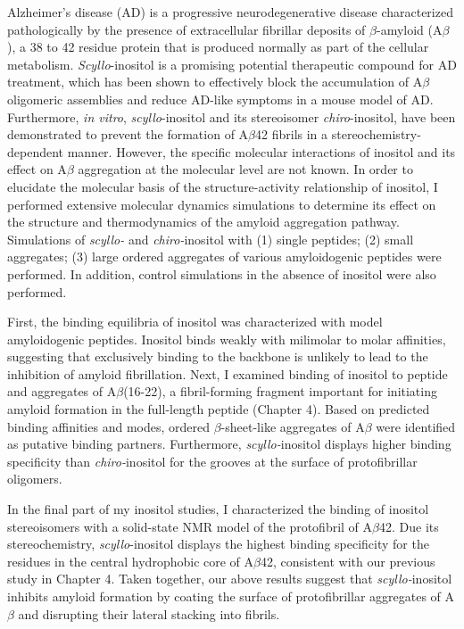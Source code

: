 Alzheimer's disease (AD) is a progressive neurodegenerative disease characterized pathologically by the presence of extracellular fibrillar deposits of $\beta$-amyloid (A$\beta$), a 38 to 42 residue protein that is produced normally as part of the cellular metabolism. \emph{Scyllo}-inositol is a promising potential therapeutic compound for AD treatment, which has been shown to effectively block the accumulation of A$\beta$ oligomeric assemblies and reduce AD-like symptoms in a mouse model of AD. Furthermore, \emph{in vitro}, \emph{scyllo}-inositol and its stereoisomer \emph{chiro}-inositol, have been demonstrated to prevent the formation of A$\beta$42 fibrils in a stereochemistry-dependent manner. However, the specific molecular interactions of inositol and its effect on A$\beta$ aggregation at the molecular level are not known. In order to elucidate the molecular basis of the structure-activity relationship of inositol, I performed extensive molecular dynamics simulations to determine its effect on the structure and thermodynamics of the amyloid aggregation pathway.  Simulations of \textit{scyllo-} and \textit{chiro-}inositol with (1) single peptides; (2) small aggregates; (3) large ordered aggregates of various amyloidogenic peptides were performed. In addition, control simulations in the absence of inositol were also performed.

First, the binding equilibria of inositol was characterized with model amyloidogenic peptides.  Inositol binds weakly with milimolar to molar affinities, suggesting that exclusively binding to the backbone is unlikely to lead to the inhibition of amyloid fibrillation. Next, I examined binding of inositol to peptide and aggregates of A$\beta$(16-22), a fibril-forming fragment important for initiating amyloid formation in the full-length peptide (Chapter 4).  Based on predicted binding affinities and modes, ordered $\beta$-sheet-like aggregates of A$\beta$ were identified as putative binding partners. Furthermore, \textit{scyllo-}inositol displays higher binding specificity than \textit{chiro-}inositol for the grooves at the surface of protofibrillar oligomers.

In the final part of my inositol studies, I characterized the binding of inositol stereoisomers with a solid-state NMR model of the protofibril of A$\beta$42. Due its stereochemistry, \textit{scyllo}-inositol displays the highest binding specificity for the residues in the central hydrophobic core of A$\beta$42, consistent with our previous study in Chapter 4. Taken together, our above results suggest that \textit{scyllo-}inositol inhibits amyloid formation by coating the surface of protofibrillar aggregates of A$\beta$ and disrupting their lateral stacking into fibrils.


